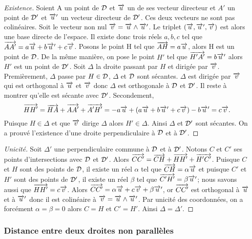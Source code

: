 \begin{proof}[Existence]
  Soient A un point de \(\mathcal{D}\) et \(\overrightarrow{u}\) un de ses vecteur directeur et 
  \(A'\) un point de \(\mathcal{D}'\) et \(\overrightarrow{u}'\) un vecteur directeur de \(\mathcal{D}'\).  
  Ces deux vecteurs ne sont pas colinéaires. Soit le vecteur non nul \(\overrightarrow{v} = 
  \overrightarrow{u}\wedge\overrightarrow{u}'\). Le triplet \((\overrightarrow{u}, \overrightarrow{u}',\overrightarrow{v})\) est alors une base directe 
  de l'espace. Il existe donc trois réels \(a, b, c\) tel que \(\overrightarrow{AA'} = 
  a\overrightarrow{u} + b\overrightarrow{u}' + c\overrightarrow{v}\). Posons le point H tel que \(\overrightarrow{AH} = a\overrightarrow{u}\), 
  alors H est un point de \(\mathcal{D}\). De la même manière, on pose le point 
  \(H'\) tel que \(\overrightarrow{H'A'} = b\overrightarrow{u}'\) alors \(H'\) est un point de 
  \(\mathcal{D}'\). Soit \(\Delta\) la droite passant par \(H\) et dirigée par 
  \(\overrightarrow{v}\).  Premièrement, \(\Delta\) passe par \(H\in\mathcal{D}\), \(\Delta\) et 
  \(\mathcal{D}\) sont sécantes. \(\Delta\) est dirigée par \(\overrightarrow{v}\) qui est 
  orthogonal à \(\overrightarrow{u}\) et \(\overrightarrow{v}\) donc \(\Delta\) est orthogonale à \(\mathcal{D}\) 
  et \(\mathcal{D}'\).  Il reste à montrer qu'elle est sécante avec \(\mathcal{D}'\). 
  Secondement,
  \begin{equation}
    \overrightarrow{HH'} = \overrightarrow{HA} + \overrightarrow{AA'} + \overrightarrow{A'H'} = -a\overrightarrow{u} + (a\overrightarrow{u} + 
    b\overrightarrow{u}' + c\overrightarrow{v}) - b\overrightarrow{u}' = c\overrightarrow{v}.
  \end{equation}
  Puisque \(H\in\Delta\) et que \(\overrightarrow{v}\) dirige \(\Delta\) alors 
  \(H'\in\Delta\). Ainsi \(\Delta\) et \(\mathcal{D}'\) sont sécantes. On a prouvé 
  l'existence d'une droite perpendiculaire à \(\mathcal{D}\) et à \(\mathcal{D}'\).
\end{proof}

\begin{proof}[Unicité]
  Soit \(\Delta'\) une perpendiculaire commune à \(\mathcal{D}\) et à \(\mathcal{D}'\).  
  Notons \(C\) et \(C'\) ses points d'intersections avec \(\mathcal{D}\) et 
  \(\mathcal{D}'\).  Alors \(\overrightarrow{CC'} = \overrightarrow{CH} + \overrightarrow{HH'} + \overrightarrow{H'C'}\).  
  Puisque \(C\) et \(H\) sont des points de \(\mathcal{D}\), il existe un réel 
  \(\alpha\) tel que \(\overrightarrow{CH} = \alpha\overrightarrow{u}\) et puisque \(C'\) et \(H'\) 
  sont des points de \(\mathcal{D}'\), il existe un réel \(\beta\) tel que 
  \(\overrightarrow{C'H'} = \beta\overrightarrow{u}'\); nous savons aussi que \(\overrightarrow{HH'} = c\overrightarrow{v}\).  
  Alors \(\overrightarrow{CC'} = \alpha\overrightarrow{u} + c\overrightarrow{v} + \beta\overrightarrow{u}'\), or \(\overrightarrow{CC'}\) est 
  orthogonal à \(\overrightarrow{u}\) et à \(\overrightarrow{u}'\) donc il est colinéaire à \(\overrightarrow{v} = 
  \overrightarrow{u}\wedge\overrightarrow{u}'\). Par unicité des coordonnées, on a forcément \(\alpha = 
  \beta = 0\) alors \(C = H\) et \(C' = H'\). Ainsi \(\Delta = \Delta'\).
\end{proof}

\subsubsection{Distance entre deux droites non parallèles}

